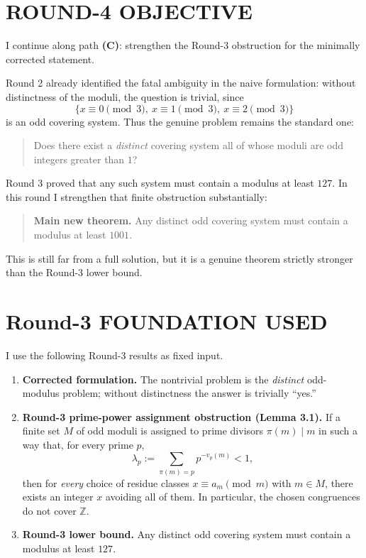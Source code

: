 \section{ROUND-4 OBJECTIVE}

I continue along path \textbf{(C)}: strengthen the Round-3 obstruction for the minimally corrected statement.

Round 2 already identified the fatal ambiguity in the naive formulation: without distinctness of the moduli, the question is trivial, since
\[
\{x \equiv 0 \pmod 3,\ x \equiv 1 \pmod 3,\ x \equiv 2 \pmod 3\}
\]
is an odd covering system. Thus the genuine problem remains the standard one:
\begin{quote}
Does there exist a \emph{distinct} covering system all of whose moduli are odd integers greater than \(1\)?
\end{quote}

Round 3 proved that any such system must contain a modulus at least \(127\). In this round I strengthen that finite obstruction substantially:

\begin{quote}
\textbf{Main new theorem.} Any distinct odd covering system must contain a modulus at least \(1001\).
\end{quote}

This is still far from a full solution, but it is a genuine theorem strictly stronger than the Round-3 lower bound.

\section{Round-3 FOUNDATION USED}

I use the following Round-3 results as fixed input.

\begin{enumerate}
\item \textbf{Corrected formulation.} The nontrivial problem is the \emph{distinct} odd-modulus problem; without distinctness the answer is trivially ``yes.'' 
\item \textbf{Round-3 prime-power assignment obstruction (Lemma 3.1).} If a finite set \(M\) of odd moduli is assigned to prime divisors \(\pi(m)\mid m\) in such a way that, for every prime \(p\),
\[
\lambda_p:=\sum_{\pi(m)=p} p^{-v_p(m)} < 1,
\]
then for \emph{every} choice of residue classes \(x\equiv a_m \pmod m\) with \(m\in M\), there exists an integer \(x\) avoiding all of them. In particular, the chosen congruences do not cover \(\mathbb Z\).
\item \textbf{Round-3 lower bound.} Any distinct odd covering system must contain a modulus at least \(127\).
\end{enumerate}

